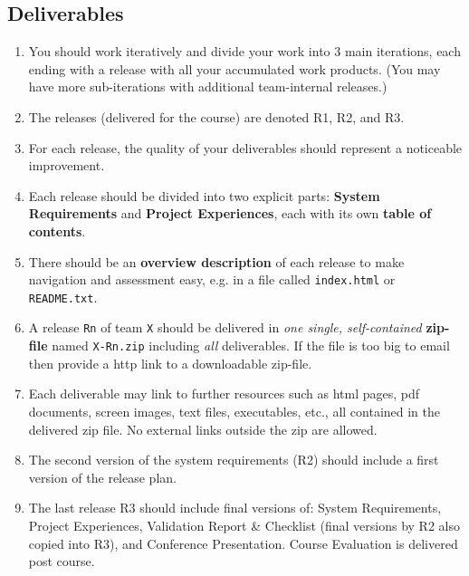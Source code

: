 \documentclass[10pt,a4paper]{article}
\begin{document}
\subsection{Deliverables}
  \begin{enumerate}[nolistsep]
    \item You should work iteratively and divide your work into 3 main iterations, each ending with a release with all your accumulated work products. (You may have more sub-iterations with additional team-internal releases.)
    \item The releases (delivered for the course) are denoted R1, R2, and R3.
    \item For each release, the quality of your deliverables should represent a noticeable improvement.
    \item Each release should be divided into two explicit parts: {\bf System Requirements} and {\bf Project Experiences}, each with its own {\bf table of contents}.
    \item There should be an {\bf overview description} of each release to make navigation and assessment easy, e.g. in a file called \verb+index.html+ or \verb+README.txt+.
    \item A release \verb+Rn+ of team \verb+X+ should be delivered in {\it one single, self-contained} {\bf zip-file} named \verb+X-Rn.zip+ including {\it all} deliverables. If the file is too big to email then provide a http link to a downloadable zip-file.
    \item Each deliverable may link to further resources such as html pages, pdf documents, screen images, text files, executables, etc., all contained in the delivered zip file. No external links outside the zip are allowed.
    \item The second version of the system requirements (R2) should include a first version of the release plan.
    \item The last release R3 should include final versions of: System Requirements, Project Experiences, Validation Report \& Checklist (final versions by R2 also copied into R3), and Conference Presentation. Course Evaluation is delivered post course.


\end{enumerate}
\end{document}
